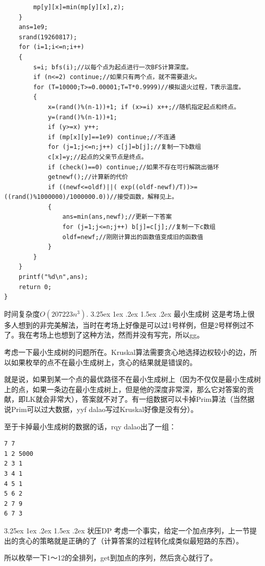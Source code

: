 \documentclass{article}
\makeatletter
\renewcommand\paragraph{\@startsection{paragraph}{4}{\z@}%
{3.25ex \@plus1ex \@minus.2ex}%
{1.5ex \@plus.2ex}%
{\normalfont\normalsize\bfseries}}
\theoremstyle{nonumberplain}
\makeatother
\begin{document}
\begin{verbatim}
        mp[y][x]=min(mp[y][x],z);
    }
    ans=1e9;
    srand(19260817);
    for (i=1;i<=n;i++)
    {
        s=i; bfs(i);//以每个点为起点进行一次BFS计算深度。
        if (n<=2) continue;//如果只有两个点，就不需要退火。
        for (T=10000;T>=0.00001;T=T*0.9999)//模拟退火过程，T表示温度。
        {
            x=(rand()%(n-1))+1; if (x>=i) x++;//随机指定起点和终点。
            y=(rand()%(n-1))+1;
            if (y>=x) y++;
            if (mp[x][y]==1e9) continue;//不连通
            for (j=1;j<=n;j++) c[j]=b[j];//复制一下b数组
            c[x]=y;//起点的父亲节点是终点。
            if (check()==0) continue;//如果不存在可行解跳出循环
            getnewf();//计算新的代价
            if ((newf<=oldf)||( exp((oldf-newf)/T))>=((rand()%1000000)/1000000.0))//接受函数，解释见上。
            {
                ans=min(ans,newf);//更新一下答案
                for (j=1;j<=n;j++) b[j]=c[j];//复制一下c数组
                oldf=newf;//刚刚计算出的函数值变成旧的函数值
            }
        }
    }
    printf("%d\n",ans);
    return 0;
}
\end{verbatim}

	时间复杂度$O(207223n^3)$.
	\paragraph{最小生成树}
	这是考场上很多人想到的非完美解法，当时在考场上好像是可以过1号样例，但是2号样例过不了。我在考场上也想到了这种方法，然而并没有写完，所以gg。

	考虑一下最小生成树的问题所在。Kruskal算法需要贪心地选择边权较小的边，所以如果枚举的点不在最小生成树上，贪心的结果就是错误的。

	就是说，如果到某一个点的最优路径不在最小生成树上（因为不仅仅是最小生成树上的点，如果一条边在最小生成树上，但是他的深度非常深，那么它对答案的贡献，即L\times K就会非常大），答案就不对了。有一组数据可以卡掉Prim算法（当然据说Prim可以过大数据，yyf dalao写过Kruskal好像是没有分）。

	至于卡掉最小生成树的数据的话，rqy dalao出了一组：
	\begin{verbatim}
7 7
1 2 5000
2 3 1
3 4 1
4 5 1
5 6 2
2 7 9
6 7 3 
\end{verbatim}
	\paragraph{状压DP}
	考虑一个事实，给定一个加点序列，上一节提出的贪心的策略就是正确的了（计算答案的过程转化成类似最短路的东西）。

	所以枚举一下1～12的全排列，get到加点的序列，然后贪心就行了。
\end{document}
